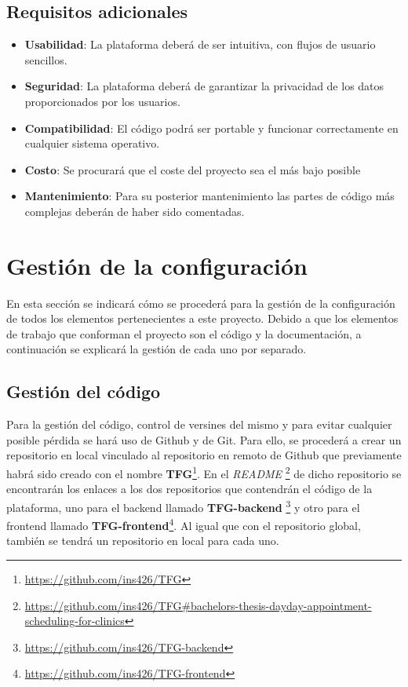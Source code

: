 \subsection{Requisitos adicionales}
\begin{itemize}
    \item \textbf{Usabilidad}: La plataforma deberá de ser intuitiva, con flujos de usuario sencillos.
    \item \textbf{Seguridad}: La plataforma deberá de garantizar la privacidad de los datos proporcionados por los usuarios.
    \item \textbf{Compatibilidad}: El código podrá ser portable y funcionar correctamente en cualquier sistema operativo.
    \item \textbf{Costo}: Se procurará que el coste del proyecto sea el más bajo posible
    \item \textbf{Mantenimiento}: Para su posterior mantenimiento las partes de código más complejas deberán de haber sido comentadas.
\end{itemize}{}


\section{Gestión de la configuración}
En esta sección se indicará cómo se procederá para la gestión de la configuración de todos los elementos pertenecientes a este proyecto. Debido a que los elementos de trabajo que conforman el proyecto son el código y la documentación, a continuación se explicará la gestión de cada uno por separado.

\subsection{Gestión del código}
Para la gestión del código, control de versines del mismo y para evitar cualquier posible pérdida se hará uso de Github y de Git. Para ello, se procederá a crear un repositorio en local vinculado al repositorio en remoto de Github que previamente habrá sido creado con el nombre \textbf{TFG}\footnote{\url{https://github.com/ins426/TFG}}. En el \textit{README} \footnote{\url{https://github.com/ins426/TFG#bachelors-thesis-dayday-appointment-scheduling-for-clinics}} de dicho repositorio se encontrarán los enlaces a los dos repositorios que contendrán el código de la plataforma, uno para el backend llamado \textbf{TFG-backend} \footnote{\url{https://github.com/ins426/TFG-backend}} y otro para el frontend llamado \textbf{TFG-frontend}\footnote{\url{https://github.com/ins426/TFG-frontend}}. Al igual que con el repositorio global, también se tendrá un repositorio en local para cada uno. \bigskip

